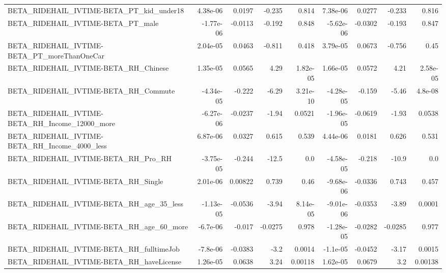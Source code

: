 \begin{tabular}{lrrrrrrrr}
BETA\_RIDEHAIL\_IVTIME-BETA\_PT\_kid\_under18           &    4.38e-06 &       0.0197 &    -0.235 &    0.814 &   7.38e-06 &      0.0277 &       -0.233 &         0.816 \\
BETA\_RIDEHAIL\_IVTIME-BETA\_PT\_male                  &   -1.77e-06 &      -0.0113 &    -0.192 &    0.848 &  -5.62e-06 &     -0.0302 &       -0.193 &         0.847 \\
BETA\_RIDEHAIL\_IVTIME-BETA\_PT\_moreThanOneCar        &    2.04e-05 &       0.0463 &    -0.811 &    0.418 &   3.79e-05 &      0.0673 &       -0.756 &          0.45 \\
BETA\_RIDEHAIL\_IVTIME-BETA\_RH\_Chinese               &    1.35e-05 &       0.0565 &      4.29 & 1.82e-05 &   1.66e-05 &      0.0572 &         4.21 &      2.58e-05 \\
BETA\_RIDEHAIL\_IVTIME-BETA\_RH\_Commute               &   -4.34e-05 &       -0.222 &     -6.29 & 3.21e-10 &  -4.28e-05 &      -0.159 &        -5.46 &       4.8e-08 \\
BETA\_RIDEHAIL\_IVTIME-BETA\_RH\_Income\_12000\_more     &   -6.27e-06 &      -0.0237 &     -1.94 &   0.0521 &  -1.96e-05 &     -0.0619 &        -1.93 &        0.0538 \\
BETA\_RIDEHAIL\_IVTIME-BETA\_RH\_Income\_4000\_less      &    6.87e-06 &       0.0327 &     0.615 &    0.539 &   4.44e-06 &      0.0181 &        0.626 &         0.531 \\
BETA\_RIDEHAIL\_IVTIME-BETA\_RH\_Pro\_RH                &   -3.75e-05 &       -0.244 &     -12.5 &      0.0 &  -4.58e-05 &      -0.218 &        -10.9 &           0.0 \\
BETA\_RIDEHAIL\_IVTIME-BETA\_RH\_Single                &    2.01e-06 &      0.00822 &     0.739 &     0.46 &  -9.68e-06 &     -0.0336 &        0.743 &         0.457 \\
BETA\_RIDEHAIL\_IVTIME-BETA\_RH\_age\_35\_less           &   -1.13e-05 &      -0.0536 &     -3.94 & 8.14e-05 &  -9.01e-06 &     -0.0353 &        -3.89 &        0.0001 \\
BETA\_RIDEHAIL\_IVTIME-BETA\_RH\_age\_60\_more           &    -6.7e-06 &       -0.017 &   -0.0275 &    0.978 &  -1.28e-05 &     -0.0282 &      -0.0285 &         0.977 \\
BETA\_RIDEHAIL\_IVTIME-BETA\_RH\_fulltimeJob           &    -7.8e-06 &      -0.0383 &      -3.2 &   0.0014 &   -1.1e-05 &     -0.0452 &        -3.17 &        0.0015 \\
BETA\_RIDEHAIL\_IVTIME-BETA\_RH\_haveLicense           &    1.26e-05 &       0.0638 &      3.24 &  0.00118 &   1.62e-05 &      0.0679 &          3.2 &       0.00138 \\

\end{tabular}
